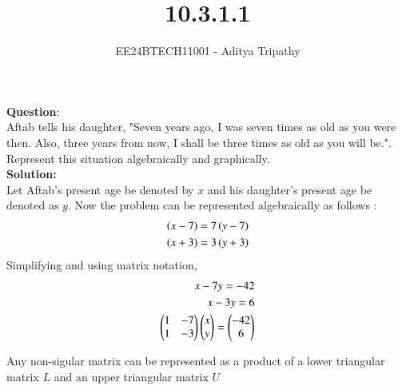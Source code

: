 \documentclass[journal]{IEEEtran}
\begin{document}

\vspace{3cm}

\title{10.3.1.1}
\author{EE24BTECH11001 - Aditya Tripathy}
 \maketitle
{\let\newpage\relax\maketitle}

\renewcommand{\thefigure}{\theenumi}
\renewcommand{\thetable}{\theenumi}
\setlength{\intextsep}{10pt} %


\renewcommand{\thetable}{\theenumi}


\textbf{Question}:\\
Aftab tells his daughter, "Seven years ago, I was seven times as old as you were then.
Also, three years from now, I shall be three times as old as you will be.". Represent
this situation algebraically and graphically.
\\
\textbf{Solution: }\\
Let Aftab's present age be denoted by $x$ and his daughter's present age be denoted as $y$.
Now the problem can be represented algebraically as follows :
\begin{align}
    \left(x-7\right) = 7\left(y-7\right)\\
    \left(x+3\right) = 3\left(y+3\right)
\end{align}
Simplifying and using matrix notation,
\begin{align}
    x -7y = -42\\
    x - 3y = 6\\
    \begin{pmatrix}
        1 & -7\\
        1 & -3
    \end{pmatrix} \begin{pmatrix}x \\ y\end{pmatrix}= \begin{pmatrix} -42 \\ 6\end{pmatrix}
\end{align}

Any non-sigular matrix can be represented as a product of a lower triangular matrix $L$ and an
upper triangular matrix $U$
\end{document}
